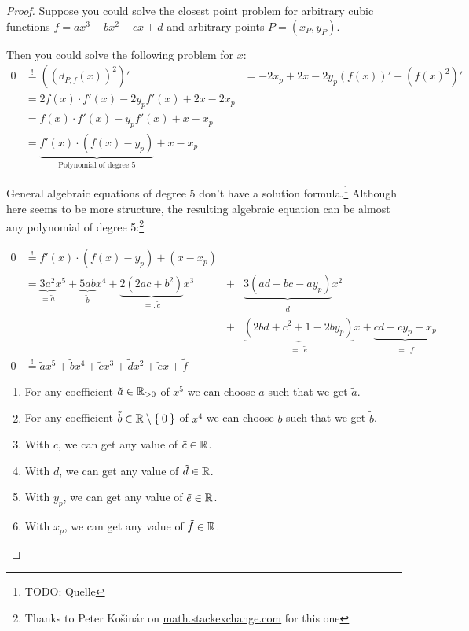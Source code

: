 \begin{proof}
    Suppose you could solve the closest point problem for arbitrary
    cubic functions $f = ax^3 + bx^2 + cx + d$ and arbitrary points $P = (x_P, y_P)$.

    Then you could solve the following problem for $x$:
    \begin{align}
        0  &\stackrel{!}{=} \left ((d_{P,f}(x))^2 \right )'
           &=-2 x_p + 2x -2y_p(f(x))' + (f(x)^2)'\\
           &= 2 f(x) \cdot f'(x) - 2 y_p f'(x) + 2x - 2 x_p\\
           &= f(x) \cdot f'(x) - y_p f'(x) + x - x_p\\
           &= \underbrace{f'(x) \cdot \left (f(x) - y_p \right )}_{\text{Polynomial of degree 5}} + x - x_p
    \end{align}

    General algebraic equations of degree 5 don't have a solution formula.\footnote{TODO: Quelle}
    Although here seems to be more structure, the resulting algebraic
    equation can be almost any polynomial of degree 5:\footnote{Thanks to Peter Košinár on \href{http://math.stackexchange.com/a/584814/6876}{math.stackexchange.com} for this one}

    \begin{align}
        0  &\stackrel{!}{=} f'(x) \cdot \left (f(x) - y_p \right ) + (x - x_p)\\
        &= \underbrace{3 a^2}_{= \tilde{a}} x^5 + \underbrace{5ab}_{\tilde{b}}x^4 + \underbrace{2(2ac + b^2 )}_{=: \tilde{c}}x^3 &+& \underbrace{3(ad+bc-ay_p)}_{\tilde{d}} x^2 \\
        & &+& \underbrace{(2 b d+c^2+1-2 b y_p)}_{=: \tilde{e}}x+\underbrace{c d-c y_p-x_p}_{=: \tilde{f}}\\
        0 &\stackrel{!}{=} \tilde{a}x^5 + \tilde{b}x^4 + \tilde{c}x^3 + \tilde{d}x^2 + \tilde{e}x + \tilde{f}
    \end{align}

    \begin{enumerate}
        \item For any coefficient $\tilde{a} \in \mathbb{R}_{> 0}$ of $x^5$ we can choose $a$ such that we get $\tilde{a}$.
        \item For any coefficient $\tilde{b} \in \mathbb{R} \setminus \Set{0}$ of $x^4$ we can choose $b$ such that we get $\tilde{b}$.
        \item With $c$, we can get any value of $\tilde{c} \in \mathbb{R}$.
        \item With $d$, we can get any value of $\tilde{d} \in \mathbb{R}$.
        \item With $y_p$, we can get any value of $\tilde{e} \in \mathbb{R}$.
        \item With $x_p$, we can get any value of $\tilde{f} \in \mathbb{R}$.
    \end{enumerate}


\end{proof}
